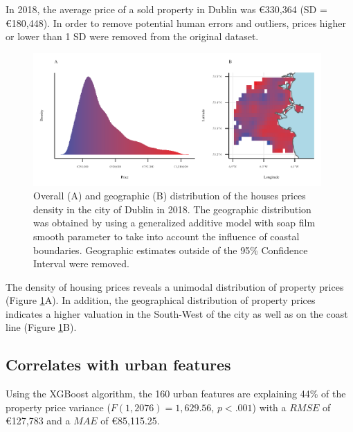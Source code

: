 \documentclass[conference,final,]{IEEEtran}
\begin{document}
In 2018, the average price of a sold property in Dublin was €330,364 (SD = €180,448). In order to remove potential human errors and outliers, prices higher or lower than 1 SD were removed from the original dataset.

\begin{figure}
\includegraphics[width=0.98\textwidth]{dsaa_application_manuscript_files/figure-latex/distrib-plot-1} \caption{Overall (A) and geographic (B) distribution of the houses prices density in the city of Dublin in 2018. The geographic distribution was obtained by using a generalized additive model with soap film smooth parameter to take into account the influence of coastal boundaries. Geographic estimates outside of the 95\% Confidence Interval were removed.}\label{fig:distrib-plot}
\end{figure}

The density of housing prices reveals a unimodal distribution of property prices (Figure \ref{fig:distrib-plot}A). In addition, the geographical distribution of property prices indicates a higher valuation in the South-West of the city as well as on the coast line (Figure \ref{fig:distrib-plot}B).

\hypertarget{correlates-with-urban-features}{%
\subsection{Correlates with urban features}\label{correlates-with-urban-features}}

Using the XGBoost algorithm, the 160 urban features are explaining 44\% of the property price variance (\(F(1, 2076) = 1,629.56\), \(p < .001\)) with a \(RMSE\) of €127,783 and a \(MAE\) of €85,115.25.
\end{document}
